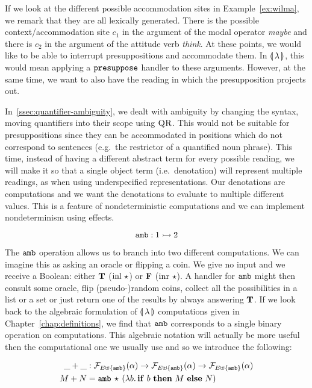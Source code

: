 If we look at the different possible accommodation sites in
Example~\ref{ex:wilma}, we remark that they are all lexically
generated. There is the possible context/accommodation site $c_1$ in the
argument of the modal operator \emph{maybe} and there is $c_2$ in the
argument of the attitude verb \emph{think}. At these points, we would like
to be able to interrupt presuppositions and accommodate them. In
$\llparenthesis \, \lambda \, \rrparenthesis$, this would mean applying a $\mathtt{presuppose}$ handler to
these arguments. However, at the same time, we want to also have the
reading in which the presupposition projects
out.

In~\ref{ssec:quantifier-ambiguity}, we dealt with ambiguity by changing the
syntax, moving quantifiers into their scope using $\textsc{QR}$. This would
not be suitable for presuppositions since they can be accommodated in
positions which do not correspond to sentences (e.g.\ the restrictor of a
quantified noun phrase). This time, instead of having a different
abstract term for every possible reading, we will make it so that a single
object term (i.e.\ denotation) will represent multiple readings, as when
using underspecified representations. Our denotations are computations and
we want the denotations to evaluate to multiple different values. This is a
feature of nondeterministic computations and we can implement
nondeterminism using effects.

$$
\mathtt{amb} : 1 \rightarrowtail 2
$$

The $\mathtt{amb}$ operation allows us to branch into two different
computations. We can imagine this as asking an oracle or flipping a
coin. We give no input and we receive a Boolean: either $\textbf{T}$
($\operatorname{inl}\,\star$) or $\textbf{F}$ ($\operatorname{inr}\,\star$). A handler for
$\mathtt{amb}$ might then consult some oracle, flip (pseudo-)random coins,
collect all the possibilities in a list or a set or just return one of the
results by always answering $\textbf{T}$. If we look back to the algebraic
formulation of $\llparenthesis \, \lambda \, \rrparenthesis$ computations given in
Chapter~\ref{chap:definitions}, we find that $\mathtt{amb}$ corresponds to a
single binary operation on computations. This algebraic notation will
actually be more useful then the computational one we usually use and so we
introduce the following:

\begin{align*}
  \_+\_ &: \mathcal{F}_{E \uplus \{\mathtt{amb}\}}(\alpha) \to \mathcal{F}_{E \uplus \{\mathtt{amb}\}}(\alpha) \to \mathcal{F}_{E \uplus \{\mathtt{amb}\}}(\alpha) \\
  M + N &= \mathtt{amb}\,\star\,(\lambda b.\, \text{\textbf{if} $b$ \textbf{then} $M$ \textbf{else} $N$})
\end{align*}

